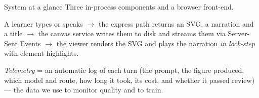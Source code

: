 \documentclass[aspectratio=169,11pt]{beamer}
\begin{document}
\begin{frame}{System at a glance}
  Three in-process components and a browser front-end.
  \vspace{2mm}
  \begin{center}
  \end{center}
  \footnotesize
  A learner types or speaks $\to$ the express path returns an SVG, a
  narration and a title $\to$ the canvas service writes them to disk and
  streams them via Server-Sent Events $\to$ the viewer renders the SVG and
  plays the narration \emph{in lock-step} with element highlights.
  \vspace{1mm}\par
  \footnotesize\color{kmgrey}
  \emph{Telemetry} = an automatic log of each turn (the prompt, the figure
  produced, which model and route, how long it took, its cost, and whether
  it passed review) --- the data we use to monitor quality and to train.
\end{frame}
\end{document}
